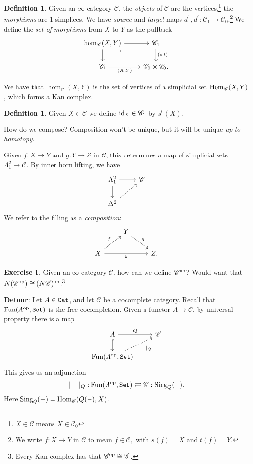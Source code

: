 \documentclass[12pt]{amsart}
\theoremstyle{definition}
\newtheorem{definition}[theorem]{Definition}
\newtheorem{exercise}[theorem]{Exercise}
\begin{document}
\begin{definition} Given an $\infty$-category $\mathscr{C}$, the \textit{objects} of $\mathscr{C}$ are the vertices,\footnote{$X\in \mathscr{C}$ means $X\in \mathscr{C}_0$} the \textit{morphisms} are 1-simplices. We have \textit{source} and \textit{target} maps $d^1,d^0: \mathscr{C}_1 \to \mathscr{C}_0$.\footnote{We write $f: X \to Y$ in $\mathscr{C}$ to mean $f\in \mathscr{C}_1$ with $s(f) = X$ and $t(f) = Y$.} We define the \textit{set of morphisms} from $X$ to $Y$ as the pullback
\[ \begin{tikzcd}
    \hom_\mathscr{C}(X,Y)\rar\dar\pb & \mathscr{C}_1\dar["{(s,t)}" right]\\
    \mathscr{C}_1\rar["{(X,Y)}" below] & \mathscr{C}_0 \times\mathscr{C}_0.
\end{tikzcd} \]
\end{definition}
We have that $\hom_\mathscr{C}(X,Y)$ is the set of vertices of a simplicial set $\text{Hom}_\mathscr{C}(X,Y)$, which forms a Kan complex.

\begin{definition} Given $X\in \mathscr{C}$ we define $\text{id}_X \in \mathscr{C}_1$ by $s^0(X)$.
\end{definition}

How do we compose? Composition won't be unique, but it will be unique \textit{up to homotopy}.

Given $f: X \to Y$ and $g: Y \to Z$ in $\mathscr{C}$, this determines a map of simplicial sets $\Lambda^2_1 \to \mathscr{C}$. By inner horn lifting, we have
\[ \begin{tikzcd}
    \Lambda^2_1\dar\rar & \mathscr{C}\\
    \Delta^2\ar[ur,dashed] & 
\end{tikzcd} \]
We refer to the filling as a \textit{composition}:
\[ \begin{tikzcd}
     & Y\ar[dr,"g" above right] & \\
    X\ar[ur,"f" above left]\ar[rr,"h" below] &  & Z.
\end{tikzcd} \]

\begin{exercise} Given an $\infty$-category $\mathscr{C}$, how can we define $\mathscr{C}^{\text{op}}$? Would want that $N(\mathscr{C}^{\text{op}}) \cong (N\mathscr{C})^{\text{op}}$.\footnote{Every Kan complex has that $\mathscr{C}^{\text{op}} \cong \mathscr{C}$.}
\end{exercise}

\textbf{Detour}: Let $A\in\texttt{Cat}$, and let $\mathscr{C}$ be a cocomplete category. Recall that $\text{Fun}(A^{\text{op}}, \texttt{Set})$ is the free cocompletion. Given a functor $A \to \mathscr{C}$, by universal property there is a map
\[ \begin{tikzcd}
    A\rar["Q"]\dar[hook] & \mathscr{C}\\
    \Fun(A^\op,\Set)\ar[ur,dashed,"|-|_Q" below right] & 
\end{tikzcd} \]
This gives us an adjunction
\begin{align*}
    |-|_Q: \text{Fun}(A^{\text{op}}, \texttt{Set}) \rightleftarrows \mathscr{C}: \text{Sing}_Q(-).
\end{align*}
Here $\text{Sing}_Q(-) =\text{Hom}_\mathscr{C}(Q(-),X)$.
\end{document}
